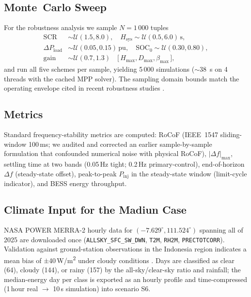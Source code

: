 \documentclass[journal]{IEEEtran}
\begin{document}
\subsection{Monte~Carlo Sweep}
For the robustness analysis we sample $N=1\,000$ tuples
\begin{align*}
\mathrm{SCR}&\sim\mathcal{U}(1.5,8.0), \quad
H_\mathrm{sys}\sim\mathcal{U}(0.5,6.0)\,\text{s},\\
\Delta P_\mathrm{load}&\sim\mathcal{U}(0.05,0.15)\,\text{pu},\quad
\mathrm{SOC}_0\sim\mathcal{U}(0.30,0.80),\\
\text{gain}&\sim\mathcal{U}(0.7,1.3)\quad
\bigl[\,H_\mathrm{max},D_\mathrm{max},\beta_\mathrm{max}\,\bigr],
\end{align*}
and run all five schemes per sample, yielding 5\,000 simulations
($\sim$\SI{38}{\second} on 4 threads with the cached MPP solver). The
sampling domain bounds match the operating envelope cited in recent
robustness studies \cite{trovato2024nadir,zhao2023inertia,liu2025frontiers}.

\subsection{Metrics}
Standard frequency-stability metrics are computed: RoCoF (IEEE~1547
sliding-window 100\,ms; we audited and corrected an earlier
sample-by-sample formulation that confounded numerical noise with
physical RoCoF), $|\Delta f|_\mathrm{max}$, settling time at two bands
(0.05\,Hz tight; 0.2\,Hz primary-control), end-of-horizon $\Delta f$
(steady-state offset), peak-to-peak $P_\mathrm{inj}$ in the
steady-state window (limit-cycle indicator), and BESS energy
throughput.

\subsection{Climate Input for the Madiun Case}
NASA POWER MERRA-2 hourly data for $(-7.629^\circ, 111.524^\circ)$
spanning all of 2025 are downloaded once
(\texttt{ALLSKY\_SFC\_SW\_DWN}, \texttt{T2M}, \texttt{RH2M},
\texttt{PRECTOTCORR}). Validation against ground-station observations
in the Indonesia region indicates a mean bias of $\pm$40\,W/m\textsuperscript{2}
under cloudy conditions \cite{rahman2020merra2,joshi2021merra2validation,yang2021nsrdb,harsarapama2020indonesia}.
Days are classified as clear (64), cloudy (144), or rainy (157) by the
all-sky/clear-sky ratio and rainfall; the median-energy day per class
is exported as an hourly profile and time-compressed (1\,hour real
$\to$ 10\,s simulation) into scenario S6.
\end{document}
